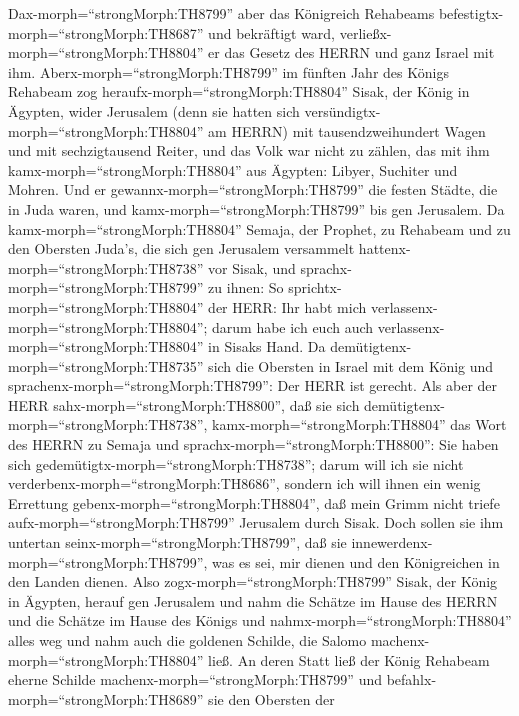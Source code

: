  Dax-morph=``strongMorph:TH8799'' aber das Königreich
Rehabeams befestigtx-morph=``strongMorph:TH8687'' und bekräftigt ward,
verließx-morph=``strongMorph:TH8804'' er das Gesetz des HERRN und ganz
Israel mit ihm.  Aberx-morph=``strongMorph:TH8799'' im
fünften Jahr des Königs Rehabeam zog
heraufx-morph=``strongMorph:TH8804'' Sisak, der König in Ägypten, wider
Jerusalem (denn sie hatten sich versündigtx-morph=``strongMorph:TH8804''
am HERRN)  mit tausendzweihundert Wagen und mit
sechzigtausend Reiter, und das Volk war nicht zu zählen, das mit ihm
kamx-morph=``strongMorph:TH8804'' aus Ägypten: Libyer, Suchiter und
Mohren.  Und er gewannx-morph=``strongMorph:TH8799'' die
festen Städte, die in Juda waren, und kamx-morph=``strongMorph:TH8799''
bis gen Jerusalem.  Da kamx-morph=``strongMorph:TH8804''
Semaja, der Prophet, zu Rehabeam und zu den Obersten Juda's, die sich
gen Jerusalem versammelt hattenx-morph=``strongMorph:TH8738'' vor Sisak,
und sprachx-morph=``strongMorph:TH8799'' zu ihnen: So
sprichtx-morph=``strongMorph:TH8804'' der HERR: Ihr habt mich
verlassenx-morph=``strongMorph:TH8804''; darum habe ich euch auch
verlassenx-morph=``strongMorph:TH8804'' in Sisaks Hand.  Da
demütigtenx-morph=``strongMorph:TH8735'' sich die Obersten in Israel mit
dem König und sprachenx-morph=``strongMorph:TH8799'': Der HERR ist
gerecht.  Als aber der HERR
sahx-morph=``strongMorph:TH8800'', daß sie sich
demütigtenx-morph=``strongMorph:TH8738'',
kamx-morph=``strongMorph:TH8804'' das Wort des HERRN zu Semaja und
sprachx-morph=``strongMorph:TH8800'': Sie haben sich
gedemütigtx-morph=``strongMorph:TH8738''; darum will ich sie nicht
verderbenx-morph=``strongMorph:TH8686'', sondern ich will ihnen ein
wenig Errettung gebenx-morph=``strongMorph:TH8804'', daß mein Grimm
nicht triefe aufx-morph=``strongMorph:TH8799'' Jerusalem durch Sisak.
 Doch sollen sie ihm untertan
seinx-morph=``strongMorph:TH8799'', daß sie
innewerdenx-morph=``strongMorph:TH8799'', was es sei, mir dienen und den
Königreichen in den Landen dienen.  Also
zogx-morph=``strongMorph:TH8799'' Sisak, der König in Ägypten, herauf
gen Jerusalem und nahm die Schätze im Hause des HERRN und die Schätze im
Hause des Königs und nahmx-morph=``strongMorph:TH8804'' alles weg und
nahm auch die goldenen Schilde, die Salomo
machenx-morph=``strongMorph:TH8804'' ließ.  An deren Statt
ließ der König Rehabeam eherne Schilde
machenx-morph=``strongMorph:TH8799'' und
befahlx-morph=``strongMorph:TH8689'' sie den Obersten der
